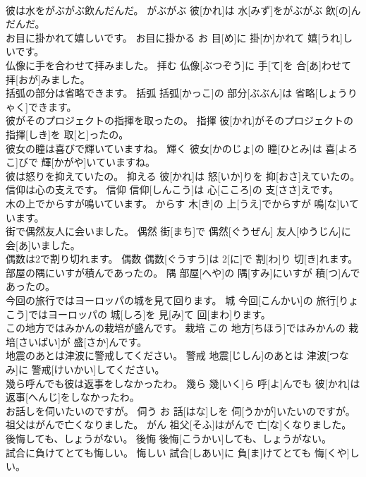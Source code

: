 \documentclass[8pt]{extreport}
\begin{document}
\begin{CJK}{UTF8}{min}
\\	彼は水をがぶがぶ飲んだんだ。	がぶがぶ	彼[かれ]は 水[みず]をがぶがぶ 飲[の]んだんだ。	
\\	お目に掛かれて嬉しいです。	お目に掛かる	お 目[め]に 掛[か]かれて 嬉[うれ]しいです。	
\\	仏像に手を合わせて拝みました。	拝む	仏像[ぶつぞう]に 手[て]を 合[あ]わせて 拝[おが]みました。	
\\	括弧の部分は省略できます。	括弧	括弧[かっこ]の 部分[ぶぶん]は 省略[しょうりゃく]できます。	
\\	彼がそのプロジェクトの指揮を取ったの。	指揮	彼[かれ]がそのプロジェクトの 指揮[しき]を 取[と]ったの。	
\\	彼女の瞳は喜びで輝いていますね。	輝く	彼女[かのじょ]の 瞳[ひとみ]は 喜[よろこ]びで 輝[かがや]いていますね。	
\\	彼は怒りを抑えていたの。	抑える	彼[かれ]は 怒[いか]りを 抑[おさ]えていたの。	
\\	信仰は心の支えです。	信仰	信仰[しんこう]は 心[こころ]の 支[ささ]えです。	
\\	木の上でからすが鳴いています。	からす	木[き]の 上[うえ]でからすが 鳴[な]いています。	
\\	街で偶然友人に会いました。	偶然	街[まち]で 偶然[ぐうぜん] 友人[ゆうじん]に 会[あ]いました。	
\\	偶数は2で割り切れます。	偶数	偶数[ぐうすう]は 2[に]で 割[わ]り 切[き]れます。	
\\	部屋の隅にいすが積んであったの。	隅	部屋[へや]の 隅[すみ]にいすが 積[つ]んであったの。	
\\	今回の旅行ではヨーロッパの城を見て回ります。	城	今回[こんかい]の 旅行[りょこう]ではヨーロッパの 城[しろ]を 見[み]て 回[まわ]ります。	
\\	この地方ではみかんの栽培が盛んです。	栽培	この 地方[ちほう]ではみかんの 栽培[さいばい]が 盛[さか]んです。	
\\	地震のあとは津波に警戒してください。	警戒	地震[じしん]のあとは 津波[つなみ]に 警戒[けいかい]してください。	
\\	幾ら呼んでも彼は返事をしなかったわ。	幾ら	幾[いく]ら 呼[よ]んでも 彼[かれ]は 返事[へんじ]をしなかったわ。	
\\	お話しを伺いたいのですが。	伺う	お 話[はな]しを 伺[うかが]いたいのですが。	
\\	祖父はがんで亡くなりました。	がん	祖父[そふ]はがんで 亡[な]くなりました。	
\\	後悔しても、しょうがない。	後悔	後悔[こうかい]しても、しょうがない。	
\\	試合に負けてとても悔しい。	悔しい	試合[しあい]に 負[ま]けてとても 悔[くや]しい。	

\end{CJK}
\end{document}
